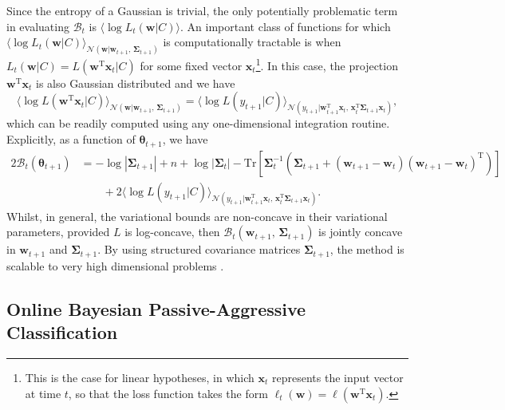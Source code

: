 Since the entropy of a Gaussian is trivial, the only potentially problematic term in evaluating $\mathcal{B}_{t}$ is $\langle\log L_t(\mathbf{w}|C)\rangle$. An important class of functions for which $\langle\log L_t(\mathbf{w}|C)\rangle_{\mathcal{N}(\mathbf{w}|\mathbf{w}_{t+1},\, \boldsymbol{\Sigma}_{t+1})}$ is computationally tractable is when $L_t(\mathbf{w}|C) = L(\mathbf{w}^\text{T}\mathbf{x}_t|C)$ for some fixed vector $\mathbf{x}_t$\footnote{This is the case for linear hypotheses, in which $\mathbf{x}_t$ represents the input vector at time $t$, so that the loss function takes the form $\ell_{t}(\mathbf{w}) = \ell(\mathbf{w}^\text{T}\mathbf{x}_t)$.}. In this case, the projection $\mathbf{w}^\text{T}\mathbf{x}_t$ is also Gaussian distributed and we have
\begin{equation}
	\langle\log L(\mathbf{w}^\text{T}\mathbf{x}_t|C)\rangle_{\mathcal{N}(\mathbf{w}|\mathbf{w}_{t+1},\, \boldsymbol{\Sigma}_{t+1})}
	= \langle\log L(y_{t+1}|C)\rangle_{\mathcal{N}(y_{t+1}|\mathbf{w}_{t+1}^\text{T}\mathbf{x}_t,\, \mathbf{x}_t^\text{T}\boldsymbol{\Sigma}_{t+1}\mathbf{x}_t)},
\end{equation}
which can be readily computed using any one-dimensional integration routine. Explicitly, as a function of $\boldsymbol{\theta}_{t+1}$, we have
\begin{equation}
\begin{split}
	2\mathcal{B}_{t}(\boldsymbol{\theta}_{t+1})
	&= -\log|\boldsymbol{\Sigma}_{t+1}| + n + \log|\boldsymbol{\Sigma}_{t}| - \mathrm{Tr}[\boldsymbol{\Sigma}_{t}^{-1}(\boldsymbol{\Sigma}_{t+1} + (\mathbf{w}_{t+1} - \mathbf{w}_{t})(\mathbf{w}_{t+1} - \mathbf{w}_{t})^\text{T})]
	\\	
	&\qquad + 2\langle\log L(y_{t+1}|C)\rangle_{\mathcal{N}(y_{t+1}|\mathbf{w}_{t+1}^\text{T}\mathbf{x}_t,\, \mathbf{x}_t^\text{T}\boldsymbol{\Sigma}_{t+1}\mathbf{x}_t)}.
\end{split}
\end{equation}
Whilst, in general, the variational bounds are non-concave in their variational parameters, provided $L$ is log-concave, then $\mathcal{B}_{t}(\mathbf{w}_{t+1}, \, \boldsymbol{\Sigma}_{t+1})$ is jointly concave in $\mathbf{w}_{t+1}$ and $\boldsymbol{\Sigma}_{t+1}$. By using structured covariance matrices $\boldsymbol{\Sigma}_{t+1}$, the method is scalable to very high dimensional problems \citep{challis11}.

\subsection{Online Bayesian Passive-Aggressive Classification}

